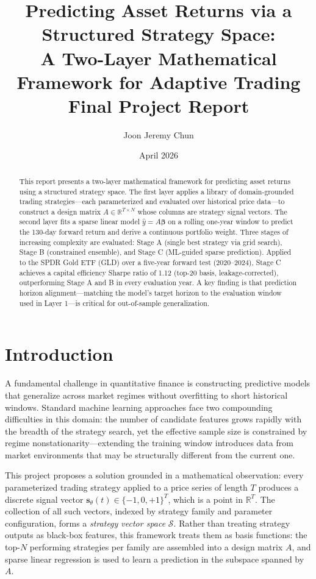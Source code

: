 \documentclass[11pt, letterpaper]{article}
\title{\textbf{Predicting Asset Returns via a Structured Strategy Space:\\
A Two-Layer Mathematical Framework for Adaptive Trading}\\[0.6em]
\large Final Project Report}
\author{Joon Jeremy Chun}
\date{April 2026}
\begin{document}
\maketitle
\thispagestyle{empty}

\begin{abstract}
This report presents a two-layer mathematical framework for predicting asset
returns using a structured strategy space. The first layer applies a library
of domain-grounded trading strategies---each parameterized and evaluated over
historical price data---to construct a design matrix $A \in \mathbb{R}^{T
\times N}$ whose columns are strategy signal vectors. The second layer fits a
sparse linear model $\hat{y} = A\boldsymbol{\beta}$ on a rolling one-year
window to predict the 130-day forward return and derive a continuous portfolio
weight. Three stages of increasing complexity are evaluated: Stage A (single
best strategy via grid search), Stage B (constrained ensemble), and Stage C
(ML-guided sparse prediction). Applied to the SPDR Gold ETF (GLD) over a
five-year forward test (2020--2024), Stage C achieves a capital efficiency
Sharpe ratio of 1.12 (top-20 basis, leakage-corrected), outperforming Stage A
and B in every evaluation year.
A key finding is that prediction horizon alignment---matching the model's
target horizon to the evaluation window used in Layer 1---is critical for
out-of-sample generalization.
\end{abstract}

\newpage
\setcounter{page}{1}

\section{Introduction}

A fundamental challenge in quantitative finance is constructing predictive
models that generalize across market regimes without overfitting to short
historical windows. Standard machine learning approaches face two compounding
difficulties in this domain: the number of candidate features grows rapidly
with the breadth of the strategy search, yet the effective sample size is
constrained by regime nonstationarity---extending the training window
introduces data from market environments that may be structurally different
from the current one.

This project proposes a solution grounded in a mathematical observation: every
parameterized trading strategy applied to a price series of length $T$ produces
a discrete signal vector $\boldsymbol{s}_\theta(t) \in \{-1, 0, +1\}^T$, which
is a point in $\mathbb{R}^T$. The collection of all such vectors, indexed by
strategy family and parameter configuration, forms a \emph{strategy vector
space} $\mathcal{S}$. Rather than treating strategy outputs as black-box
features, this framework treats them as basis functions: the top-$N$ performing
strategies per family are assembled into a design matrix $A$, and sparse linear
regression is used to learn a prediction in the subspace spanned by $A$.
\end{document}
